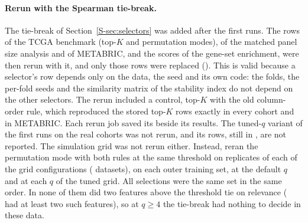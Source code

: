 \paragraph{Rerun with the Spearman tie-break.} The tie-break of
Section~\ref{S-sec:selectors} was added after the first runs. The  rows of
the TCGA benchmark (top-$K$ and permutation modes), of the matched panel size analysis and
of METABRIC, and the  scores of the gene-set enrichment, were then rerun
with it, and only those rows were replaced (). This is valid
because a selector's row depends only on the data, the seed and its own code: the folds,
the per-fold seeds and the similarity matrix of the stability index do not depend on the
other selectors. The rerun included a control, top-$K$ with the old column-order rule,
which reproduced the stored top-$K$ rows exactly in every cohort and in METABRIC. Each
rerun job saved its  beside its results. The tuned-$q$ variant of the first runs on the real cohorts was not rerun, and its rows, still
in , are not reported. The simulation grid was not rerun
either. Instead,  reran the permutation mode with both rules
at the same threshold on \SuppTieCheckReps{} replicates of each of the
\SuppTieCheckConfigs{} grid configurations (\SuppTieCheckDatasets{} datasets), on each
outer training set, at the default $q$ and at each $q$ of the tuned grid. All
\SuppTieCheckN{} selections were the same set in the same order. In none of them did two
features above the threshold tie on relevance (\SuppTieCheckMulti{} had at least two such
features), so at $q \geq 4$ the tie-break had nothing to decide in these data.

\begin{table}[htbp]
\centering\footnotesize
\caption{Main R packages, with the versions pinned in .}
\label{S-tab:software}

\end{table}

